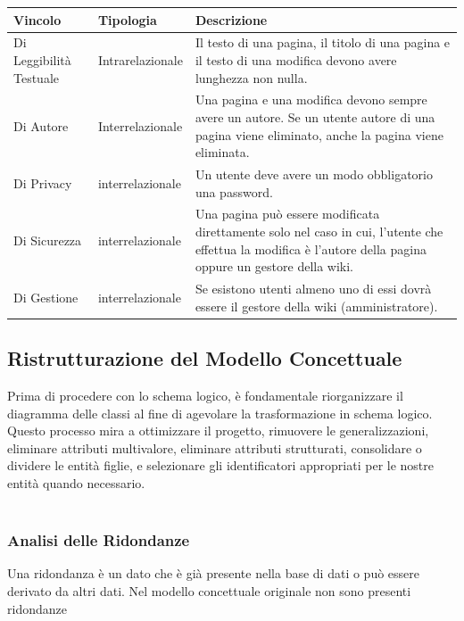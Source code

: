 \documentclass{article}
\begin{document}
{\begin{table}[H]
		
		\begin{tabularx}{\textwidth}{|l|l|X|}
			\hline
			\textbf{Vincolo} &\textbf{Tipologia}  & \textbf{Descrizione} \\
			\hline
			Di Leggibilità Testuale & Intrarelazionale & Il testo di una pagina, il titolo di una pagina e il testo di una modifica devono avere lunghezza non nulla.
			\\
			\hline
			Di Autore & Interrelazionale & Una pagina e una modifica devono sempre avere un autore. Se un utente autore di una pagina viene eliminato, anche la pagina viene eliminata.
			\\
			\hline
			Di Privacy & interrelazionale  & Un utente deve avere un modo obbligatorio una password.
			\\
			\hline	
			Di Sicurezza & interrelazionale  & Una pagina può essere modificata direttamente solo nel caso in cui, l'utente che effettua la modifica è l'autore della pagina oppure un gestore della wiki.
			\\
			\hline	
			Di Gestione & interrelazionale  & Se esistono utenti almeno uno di essi dovr\`a essere il gestore della wiki (amministratore).
			\\
			\hline
			
		\end{tabularx}
		
	\end{table}
	
	\newpage
	
	{\subsection{Ristrutturazione del Modello Concettuale}}
	Prima di procedere con lo schema logico, è fondamentale riorganizzare il diagramma delle classi al fine di agevolare la trasformazione in schema logico. Questo processo mira a ottimizzare il progetto, rimuovere le generalizzazioni, eliminare attributi multivalore, eliminare attributi strutturati, consolidare o dividere le entità figlie, e selezionare gli identificatori appropriati per le nostre entità quando necessario. 			\\\\
		

	{\subsubsection{Analisi delle Ridondanze}}

	Una ridondanza è un dato che è già presente nella base di dati o può essere
	derivato da altri dati.
	Nel modello concettuale originale non sono presenti ridondanze 	\\\\
	
}
\end{document}
